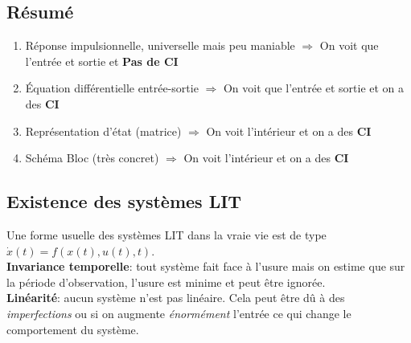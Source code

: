 \documentclass{report}
\begin{document}
\subsection{Résumé}
\begin{enumerate}
\item Réponse impulsionnelle, universelle mais peu maniable $\Rightarrow$ On voit que l'entrée et sortie et \textbf{Pas de CI}
\item Équation différentielle entrée-sortie $\Rightarrow$ On voit que l'entrée et sortie et on a des \textbf{CI}
\item Représentation d'état (matrice) $\Rightarrow$ On voit l'intérieur et on a des \textbf{CI}
\item Schéma Bloc (très concret) $\Rightarrow$ On voit l'intérieur et on a des \textbf{CI}
\end{enumerate}

\subsection{Existence des systèmes LIT}
Une forme usuelle des systèmes LIT dans la vraie vie est de type $\dot{x}(t) = f(x(t), u(t), t)$.\\
\textbf{Invariance temporelle}: tout système fait face à l'usure mais on estime que sur la période d'observation, l'usure est minime et peut être ignorée.\\
\textbf{Linéarité}: aucun système n'est pas linéaire. Cela peut être dû à des \textit{imperfections} ou si on augmente \textit{énormément} l'entrée ce qui change le comportement du système.\\
\end{document}
